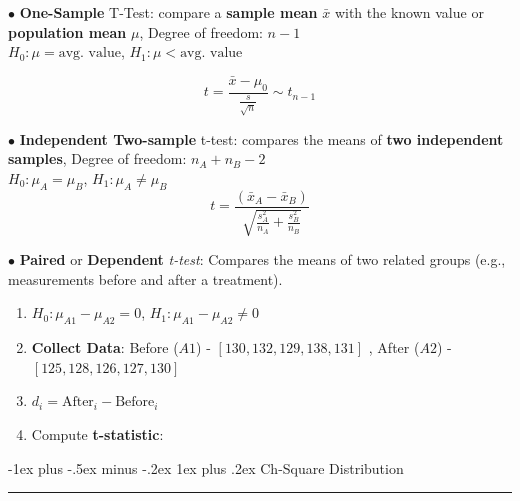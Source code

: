 \documentclass[letterpaper, 10.5pt,landscape]{article}
\makeatletter
\renewcommand{\subsubsection}{\@startsection{subsubsection}{3}{0mm}%
                                {-1ex plus -.5ex minus -.2ex}%
                                {1ex plus .2ex}%
                                {\normalfont\small\bfseries}}
\makeatother
\begin{document}
\begin{multicols*}{3}
\vspace{3pt}

$\bullet$ \textbf{One-Sample} T-Test: compare a \textbf{sample mean} $\bar{x}$ with the  known value or \textbf{population mean} $\mu$, Degree of freedom: $n-1$ \\
\(H_{0}: \mu = \text{avg. value}\), \quad \(H_{1}: \mu < \text{avg. value}\)

 \vspace{-3pt}
\[\boxed{t = \frac{\bar{x} - \mu_{0}}{\frac{s}{\sqrt{n}}}  \sim t_{n-1}}\]

 
 
$\bullet$ \textbf{Independent Two-sample} t-test: compares the means of \textbf{two independent samples},  Degree of freedom: $n_{A} + n_{B} -  2$ \\
\(H_{0}: \mu_{A} = \mu_{B}\), \quad \(H_{1}: \mu_{A} \neq \mu_{B}\)
 \vspace{-3pt}
\[\boxed{t = \frac{\left(\bar{x}_{A} - \bar{x}_{B} \right)}{\sqrt{\frac{s^{2}_{A}}{n_{A}} + \frac{s^{2}_{B}}{n_{B}}}}} \]

$\bullet$ \textbf{Paired} or \textbf{Dependent} \textit{t-test}:  Compares the means of two related groups (e.g., measurements before and after a treatment).

\vspace{-2pt}
\begin{enumerate}
    \item \(H_{0}: \mu_{A1} - \mu_{A2} = 0\), \quad \(H_{1}: \mu_{A1} - \mu_{A2} \neq 0\)
    \vspace{-2pt}
    \item \textbf{Collect Data}: Before ($A1$) - \([130, 132, 129, 138, 131]\) \(\), After ($A2$) - \([125, 128, 126, 127, 130]\)
    \vspace{-2pt}
    \item \(d_{i} = \text{After}_{i} - \text{Before}_{i}\)
    \vspace{-2pt}
    \item Compute \textbf{t-statistic}: 
    \vspace{-2pt}
\end{enumerate}





\vspace{3pt}
\subsubsection{Ch-Square Distribution}{\color{teal}\hrule height 0.5pt} \smallskip


\end{multicols*}
\end{document}
